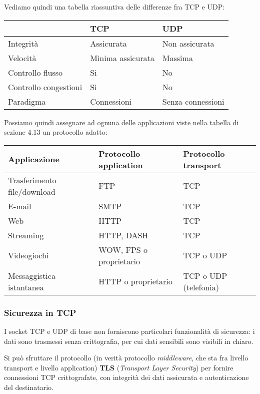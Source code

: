 \documentclass[a4paper,11pt]{article}
\begin{document}
Vediamo quindi una tabella riassuntiva delle differenze fra TCP e UDP:
\begin{table}[h!]
	\center {}
	\begin{tabular} { p{5cm} | p{5cm} | p{5cm} }
		& \bfseries TCP & \bfseries UDP \\ 
		\hline
		Integrità & Assicurata & Non assicurata \\ 
		Velocità & Minima assicurata & Massima \\ 
		Controllo flusso & Si & No \\ 
		Controllo congestioni & Si & No \\ 
		Paradigma & Connessioni & Senza connessioni
	\end{tabular}
\end{table}

\par\smallskip

Possiamo quindi assegnare ad ognuna delle applicazioni viste nella tabella di sezione 4.13 un protocollo adatto:
\begin{table}[H]
	\center {}
	\begin{tabular} { p{3cm} || p{5cm} | p{5cm} }
		\bfseries Applicazione & \bfseries Protocollo application & \bfseries Protocollo transport \\ 
		\hline
		Trasferimento file/download & FTP & TCP \\
		E-mail & SMTP & TCP \\ 
		Web & HTTP & TCP \\ 
		Streaming & HTTP, DASH & TCP \\ 
		Videogiochi & WOW, FPS o proprietario & TCP o UDP \\ 
		Messaggistica istantanea & HTTP o proprietario & TCP o UDP (telefonia) \\ 
	\end{tabular}
\end{table}

\subsubsection{Sicurezza in TCP}
I socket TCP e UDP di base non forniscono particolari funzionalità di sicurezza: i dati sono trasmessi senza crittografia, per cui dati sensibili sono visibili in chiaro.

Si può sfruttare il protocollo (in verità protocollo \textit{middleware}, che sta fra livello transport e livello application) \textbf{TLS} (\textit{Transport Layer Security}) per fornire connessioni TCP crittografate, con integrità dei dati assicurata e autenticazione del destinatario.
\end{document}
